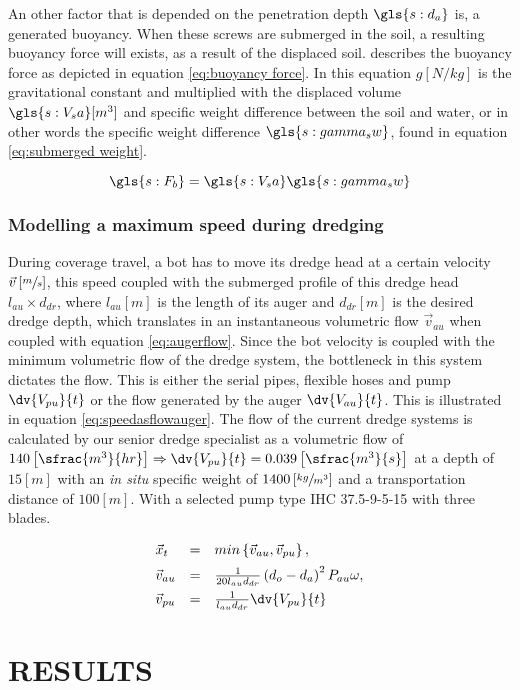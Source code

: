 An other factor that is depended on the penetration depth $ \gls{s:d_a} $ is, a generated buoyancy. When these screws are submerged in the soil, a resulting buoyancy force will exists, as a result of the displaced soil. \citet{lotman_applicable_2009} describes the buoyancy force as depicted in equation \ref{eq:buoyancy force}. In this equation $ g [N/kg] $ is the gravitational constant and multiplied with the displaced volume $ \gls{s:V_sa} [m^3] $ and specific weight difference between the soil and water, or in other words the specific weight difference $ \gls{s:gamma_sw} $, found in equation \ref{eq:submerged weight}.

\begin{sBox}
	\begin{equation}\label{eq:buoyancy force}
	\gls{s:F_b} = \gls{s:V_sa} \gls{s:gamma_sw}
	\end{equation}
\end{sBox}

\subsubsection{Modelling a maximum speed during dredging}
During coverage travel, a bot has to move its dredge head at a certain velocity $ \vec{v} \left[\sfrac{m}{s}\right] $, this speed coupled with the submerged profile of this dredge head $ l_{au} \times d_{dr} $, where $ l_{au} [m] $ is the length of its auger and $ d_{dr} [m] $ is the desired dredge depth, which translates in an instantaneous volumetric flow $ \vec{v}_{au} $ when coupled with equation \ref{eq:augerflow}. Since the bot velocity is coupled with the minimum volumetric flow of the dredge system, the bottleneck in this system dictates the flow. This is either the serial pipes, flexible hoses and pump $ \dv{V_{pu}}{t} $ or the flow generated by the auger $ \dv{V_{au}}{t} $. This is illustrated in equation \ref{eq:speedasflowauger}. The flow of the current dredge systems is calculated by our senior dredge specialist as a volumetric flow of $ 140 \left[ \sfrac{m^3}{hr} \right] \Rightarrow \dv{V_{pu}}{t} = 0.039 \left[\sfrac{m^3}{s}\right]  $ at a depth of $ 15 [m] $ with an \emph{in situ} specific weight of $ 1400 \left[\sfrac{kg}{m^3}\right] $ and a transportation distance of $ 100 [m] $. With a selected pump type IHC 37.5-9-5-15 with three blades.

\begin{sBox}
	\begin{equation}\label{eq:speedasflowauger}
	\begin{array}{lcl}
		\vec{x}_{t} & = & min\left\{\vec{v}_{au}, \vec{v}_{pu}\right\}, \\[0.5em]
		\vec{v}_{au} & = & \frac{1}{20 l_{au} d_{dr}} \left(d_{o} - d_{a}\right)^2 P_{au}\omega, \\[0.5em]
		\vec{v}_{pu} & = & \frac{1}{l_{au} d_{dr}} \dv{V_{pu}}{t}
	\end{array}
	\end{equation}
\end{sBox}

\section{RESULTS}\label{sec:results}
